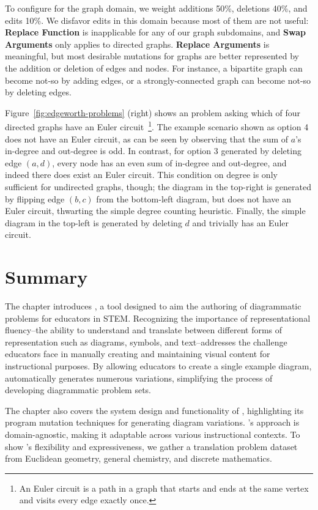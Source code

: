 To configure \Edgeworth for the graph domain, we weight additions 50\%, deletions 40\%, and edits 10\%. We disfavor edits in this domain because most of them are not useful: \textbf{Replace Function} is inapplicable for any of our graph subdomains, and \textbf{Swap Arguments} only applies to directed graphs. \textbf{Replace Arguments} is meaningful, but most desirable mutations for graphs are better represented by the addition or deletion of edges and nodes. For instance, a bipartite graph can become not-so by adding edges, or a strongly-connected graph can become not-so by deleting edges. 

Figure~\ref{fig:edgeworth-problems} (right) shows an \Edgeworth problem asking which of four directed graphs have an Euler circuit~\footnote{An Euler circuit is a path in a graph that starts and ends at the same vertex and visits every edge exactly once.}. The example scenario shown as option 4 does not have an Euler circuit, as can be seen by observing that the sum of $a$'s in-degree and out-degree is odd. In contrast, for option 3 generated by deleting edge $(a, d)$, every node has an even sum of in-degree and out-degree, and indeed there does exist an Euler circuit. This condition on degree is only sufficient for undirected graphs, though; the diagram in the top-right is generated by flipping edge $(b, c)$ from the bottom-left diagram, but does not have an Euler circuit, thwarting the simple degree counting heuristic. Finally, the simple diagram in the top-left is generated by deleting $d$ and trivially has an Euler circuit. 

\section{Summary}

The chapter introduces \Edgeworth, a tool designed to aim the authoring of diagrammatic problems for educators in STEM. Recognizing the importance of representational fluency--the ability to understand and translate between different forms of representation such as diagrams, symbols, and text--\Edgeworth addresses the challenge educators face in manually creating and maintaining visual content for instructional purposes. By allowing educators to create a single example diagram, \Edgeworth automatically generates numerous variations, simplifying the process of developing diagrammatic problem sets. 

The chapter also covers the system design and functionality of \Edgeworth{}, highlighting its program mutation techniques for generating diagram variations. \Edgeworth's approach is domain-agnostic, making it adaptable across various instructional contexts. To show \Edgeworth's flexibility and expressiveness, we gather a translation problem dataset from Euclidean geometry, general chemistry, and discrete mathematics.


